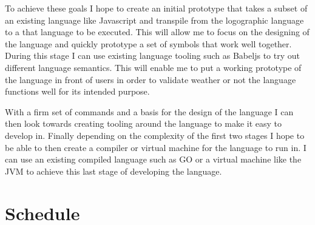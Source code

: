 \documentclass[12pt]{article}
\begin{document}
To achieve these goals I hope to create an initial prototype that takes a subset of an existing language like Javascript and transpile from the logographic 
language to a that language to be executed. This will allow me to focus on the designing of the language and quickly prototype a set of symbols that work well together.
During this stage I can use existing language tooling such as Babeljs \parencite{noauthor_babel_nodate} to try out different language semantics. This will enable me to put a working prototype of the language in front of
users in order to validate weather or not the language functions well for its intended purpose.

With a firm set of commands and a basis for the design of the language I can then look towards creating tooling around the language to make it easy to develop in. Finally depending on
the complexity of the first two stages I hope to be able to then create a compiler or virtual machine for the language to run in. I can use an existing compiled language such as GO or a virtual machine like the JVM
to achieve this last stage of developing the language.


\section{Schedule}


\end{document}

